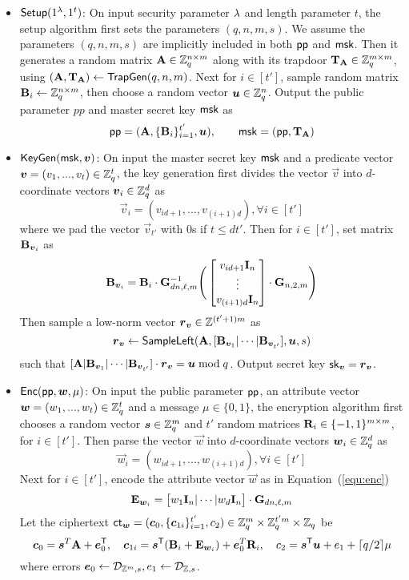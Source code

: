 \begin{itemize}[leftmargin=*]
 \item $\mathsf{Setup}(1^\lambda, 1^t)$: On input security parameter $\lambda$ and length parameter $t$, the setup algorithm first sets the parameters $(q, n, m, s)$. We assume the parameters $(q, n, m, s)$ are implicitly included in both $\mathsf{pp}$ and $\mathsf{msk}$. Then it generates a random matrix $\mathbf{A} \in \mathbb{Z}_q^{n \times m}$ along with its trapdoor $\mathbf{T}_{\mathbf{A}} \in \mathbb{Z}_q^{m \times m}$, using $(\mathbf{A}, \mathbf{T}_{\mathbf{A}}) \leftarrow \mathsf{TrapGen}(q, n, m)$. Next for $i \in [t']$, sample random matrix $\mathbf{B}_i \leftarrow \mathbb{Z}_q^{n \times m}$, then choose a random vector $\boldsymbol{u} \in \mathbb{Z}_q^n$.  Output the public parameter $pp$ and master secret key $\mathsf{msk}$ as
  $$\mathsf{pp} = (\mathbf{A}, \{\mathbf{B}_i\}_{i = 1}^{t'}, \boldsymbol{u}), \qquad \mathsf{msk} = (\mathsf{pp}, \mathbf{T}_{\mathbf{A}})$$

 \item $\mathsf{KeyGen}(\mathsf{msk}, \boldsymbol{v})$: On input the master secret key $\mathsf{msk}$ and a predicate vector $\boldsymbol{v} = (v_1,..., v_t) \in \mathbb{Z}_q^t$, the key generation first divides the vector $\vec{v}$ into $d$-coordinate vectors $\boldsymbol{v}_i \in \mathbb{Z}_q^d$ as
 $$\vec{v}_i = (v_{id + 1},..., v_{(i + 1)d}), \forall i \in [t']$$
 where we pad the vector $\vec{v}_{t'}$ with 0s if $t \leq d t'$. Then for $i \in [t']$, set matrix $\mathbf{B}_{\boldsymbol{v}_i}$ as
 $$\mathbf{B}_{\boldsymbol{v}_i} = \mathbf{B}_i \cdot \mathbf{G}_{dn, \ell, m}^{-1}
 \Bigg(\begin{bmatrix}
v_{id + 1}\mathbf{I}_n \\
\vdots \\
v_{(i + 1)d}\mathbf{I}_n
\end{bmatrix} \cdot \mathbf{G}_{n, 2, m}\Bigg)$$
Then sample a low-norm vector $\boldsymbol{r}_{\boldsymbol{v}} \in \mathbb{Z}^{(t' + 1)m}$ as
$$\boldsymbol{r}_{\boldsymbol{v}} \leftarrow \mathsf{SampleLeft}(\mathbf{A}, [\mathbf{B}_{\boldsymbol{v}_1} | \cdots | \mathbf{B}_{\boldsymbol{v}_{t'}}], \boldsymbol{u}, s)$$
such that $[\mathbf{A} | \mathbf{B}_{\boldsymbol{v}_1} | \cdots | \mathbf{B}_{\boldsymbol{v}_{t'}}] \cdot \boldsymbol{r}_{\boldsymbol{v}} = \boldsymbol{u} \bmod q$. Output secret key $\mathsf{sk}_{\boldsymbol{v}} = \boldsymbol{r}_{\boldsymbol{v}}$.

\item $\mathsf{Enc}(\mathsf{pp}, \boldsymbol{w}, \mu)$: On input the public parameter $\mathsf{pp}$, an attribute vector $\boldsymbol{w} = (w_1,..., w_t) \in \mathbb{Z}_q^t$ and a message $\mu \in \{0,1\}$, the encryption algorithm first chooses a random vector $\boldsymbol{s} \in \mathbb{Z}_q^m$ and $t'$ random matrices $\mathbf{R}_i \in \{-1, 1\}^{m \times m}$, for $i \in [t']$. Then parse the vector $\vec{w}$ into $d$-coordinate vectors $\boldsymbol{w}_i \in \mathbb{Z}_q^d$ as
 $$\vec{w}_i = (w_{id + 1},..., w_{(i + 1)d}), \forall i \in [t']$$
Next for $i \in [t']$, encode the attribute vector $\vec{w}$ as in Equation~(\ref{equ:enc})
 $$\mathbf{E}_{\boldsymbol{w}_i} = \big[w_1 \mathbf{I}_n | \cdots | w_d \mathbf{I}_n \big] \cdot
\mathbf{G}_{dn, \ell, m}$$
Let the ciphertext $\mathsf{ct}_{\boldsymbol{w}} = (\boldsymbol{c}_0, \{\boldsymbol{c}_{1i}\}_{i = 1}^{t'}, c_2) \in \mathbb{Z}_q^m \times \mathbb{Z}_q^{t'm} \times \mathbb{Z}_q$ be
$$\boldsymbol{c}_0 = \boldsymbol{s}^T \mathbf{A} + \boldsymbol{e}^{\mathsf{T}}_0, \quad \boldsymbol{c}_{1i} = \boldsymbol{s}^{\mathsf{T}} (\mathbf{B}_i + \mathbf{E}_{\boldsymbol{w}_i}) + \boldsymbol{e}_0^T \mathbf{R}_i, \quad c_2 = \boldsymbol{s}^{\mathsf{T}} \boldsymbol{u} + e_1 + \lceil q / 2 \rceil \mu$$
where errors $\boldsymbol{e}_0 \leftarrow \mathcal{D}_{\mathbb{Z}^m, s}, e_1 \leftarrow \mathcal{D}_{\mathbb{Z}, s}$.


\end{itemize}
